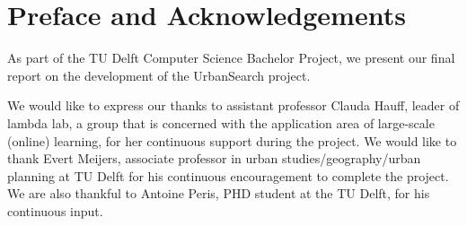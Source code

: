 \chapter*{Preface and Acknowledgements}
As part of the TU Delft Computer Science Bachelor Project, we present our final report on the development of the UrbanSearch project. 

We would like to express our thanks to assistant professor Clauda Hauff, leader of lambda lab, a group that is concerned with the application area of large-scale (online) learning, for her continuous support during the project. We would like to thank Evert Meijers, associate professor in urban studies/geography/urban planning at TU Delft for his continuous encouragement to complete the project. We are also thankful to Antoine Peris, PHD student at the TU Delft, for his continuous input.